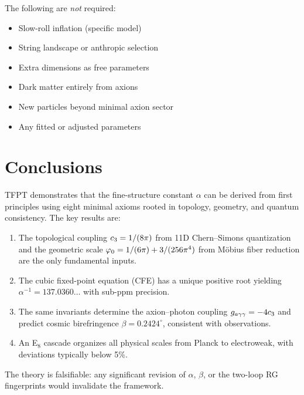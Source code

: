 The following are \emph{not} required:
\begin{itemize}[leftmargin=2em]
    \item[\ding{55}] Slow-roll inflation (specific model)
    \item[\ding{55}] String landscape or anthropic selection
    \item[\ding{55}] Extra dimensions as free parameters
    \item[\ding{55}] Dark matter entirely from axions
    \item[\ding{55}] New particles beyond minimal axion sector
    \item[\ding{55}] Any fitted or adjusted parameters
\end{itemize}

\section{Conclusions}

TFPT demonstrates that the fine-structure constant $\alpha$ can be derived 
from first principles using eight minimal axioms rooted in topology, geometry, 
and quantum consistency. The key results are:

\begin{enumerate}
    \item The topological coupling $c_3 = 1/(8\pi)$ from 11D Chern--Simons 
        quantization and the geometric scale $\varphi_0 = 1/(6\pi) + 3/(256\pi^4)$ 
        from M\"obius fiber reduction are the only fundamental inputs.
    
    \item The cubic fixed-point equation (CFE) has a unique positive root 
        yielding $\alpha^{-1} = 137.0360\ldots$ with sub-ppm precision.
    
    \item The same invariants determine the axion--photon coupling 
        $g_{a\gamma\gamma} = -4c_3$ and predict cosmic birefringence 
        $\beta = 0.2424^\circ$, consistent with observations.
    
    \item An E$_8$ cascade organizes all physical scales from Planck to 
        electroweak, with deviations typically below 5\%.
\end{enumerate}

The theory is falsifiable: any significant revision of $\alpha$, $\beta$, 
or the two-loop RG fingerprints would invalidate the framework.

\appendix
